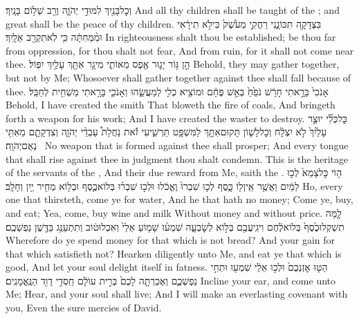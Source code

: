 {וְכׇל\maqqaf בָּנַ֖יִךְ לִמּוּדֵ֣י יְהֹוָ֑ה וְרַ֖ב שְׁל֥וֹם בָּנָֽיִךְ׃}
{And all thy children shall be taught of the \lord; and great shall be the peace of thy children.}
{בִּצְדָקָ֖ה תִּכּוֹנָ֑נִי רַחֲקִ֤י מֵעֹ֙שֶׁק֙ כִּי\maqqaf לֹ֣א תִירָ֔אִי וּמִ֨מְּחִתָּ֔ה כִּ֥י לֹֽא\maqqaf תִקְרַ֖ב אֵלָֽיִךְ׃}
{In righteousness shalt thou be established; be thou far from oppression, for thou shalt not fear, And from ruin, for it shall not come near thee.}
{הֵ֣ן גּ֥וֹר יָג֛וּר אֶ֖פֶס מֵאוֹתִ֑י מִי\maqqaf גָ֥ר אִתָּ֖ךְ עָלַ֥יִךְ יִפּֽוֹל׃}
{Behold, they may gather together, but not by Me; Whosoever shall gather together against thee shall fall because of thee.}
{ אָנֹכִי֙ בָּרָ֣אתִי חָרָ֔שׁ נֹפֵ֙חַ֙ בְּאֵ֣שׁ פֶּחָ֔ם וּמוֹצִ֥יא כְלִ֖י לְמַעֲשֵׂ֑הוּ וְאָנֹכִ֛י בָּרָ֥אתִי מַשְׁחִ֖ית לְחַבֵּֽל׃}
{Behold, I have created the smith That bloweth the fire of coals, And bringeth forth a weapon for his work; And I have created the waster to destroy.}
{כׇּל\maqqaf כְּלִ֞י יוּצַ֤ר עָלַ֙יִךְ֙ לֹ֣א יִצְלָ֔ח וְכׇל\maqqaf לָשׁ֛וֹן תָּקוּם\maqqaf אִתָּ֥ךְ לַמִּשְׁפָּ֖ט תַּרְשִׁ֑יעִי זֹ֡את נַחֲלַת֩ עַבְדֵ֨י יְהֹוָ֧ה וְצִדְקָתָ֛ם מֵאִתִּ֖י נְאֻם\maqqaf יְהֹוָֽה׃ \setuma }
{No weapon that is formed against thee shall prosper; And every tongue that shall rise against thee in judgment thou shalt condemn. This is the heritage of the servants of the \lord, And their due reward from Me, saith the \lord.}
\newperek
{}
{ה֤וֹי כׇּל\maqqaf צָמֵא֙ לְכ֣וּ לַמַּ֔יִם וַאֲשֶׁ֥ר אֵֽין\maqqaf ל֖וֹ כָּ֑סֶף לְכ֤וּ שִׁבְרוּ֙ וֶאֱכֹ֔לוּ וּלְכ֣וּ שִׁבְר֗וּ בְּלוֹא\maqqaf כֶ֛סֶף וּבְל֥וֹא מְחִ֖יר יַ֥יִן וְחָלָֽב׃}
{Ho, every one that thirsteth, come ye for water, And he that hath no money; Come ye, buy, and eat; Yea, come, buy wine and milk Without money and without price.}
{לָ֤מָּה תִשְׁקְלוּ\maqqaf כֶ֙סֶף֙ בְּלוֹא\maqqaf לֶ֔חֶם וִיגִֽיעֲכֶ֖ם בְּל֣וֹא לְשׇׂבְעָ֑ה שִׁמְע֨וּ שָׁמ֤וֹעַ אֵלַי֙ וְאִכְלוּ\maqqaf ט֔וֹב וְתִתְעַנַּ֥ג בַּדֶּ֖שֶׁן נַפְשְׁכֶֽם׃}
{Wherefore do ye spend money for that which is not bread? And your gain for that which satisfieth not? Hearken diligently unto Me, and eat ye that which is good, And let your soul delight itself in fatness.}
{הַטּ֤וּ אׇזְנְכֶם֙ וּלְכ֣וּ אֵלַ֔י שִׁמְע֖וּ וּתְחִ֣י נַפְשְׁכֶ֑ם וְאֶכְרְתָ֤ה לָכֶם֙ בְּרִ֣ית עוֹלָ֔ם חַֽסְדֵ֥י דָוִ֖ד הַנֶּֽאֱמָנִֽים׃}
{Incline your ear, and come unto Me; Hear, and your soul shall live; And I will make an everlasting covenant with you, Even the sure mercies of David.}
